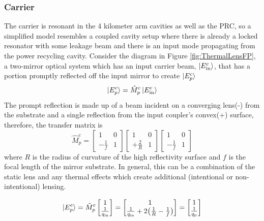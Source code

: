 		\subsubsection{Carrier}\label{Sec:carrier_lensing}
		The carrier is resonant in the 4 kilometer arm cavities as well as the PRC, so a simplified model resembles a coupled cavity setup where there is already a locked resonator with some leakage beam and there is an input mode propagating from the power recycling cavity.  Consider the diagram in Figure \ref{fig:ThermalLensFP}, a two-mirror optical system which has an input carrier beam, $\ket{E^c_{\text{in}}}$, that has a portion promptly reflected off the input mirror to create $\ket{E^c_{p}}$
		\begin{equation}
		\ket{E^{c}_{p}} = \hat{M}^{c}_{p} \ket{E^{c}_{\text{in}}}
		\end{equation}
		The prompt reflection is made up of a beam incident on a converging lens(-) from the substrate and a single reflection from the input coupler's convex(+) surface, therefore, the transfer matrix is
		\begin{equation}
		\hat{M}^{c}_{p} = 
		\begin{bmatrix}
						1 	&	0 
		\\ 	-\frac{1}{f} 	&	1
		\end{bmatrix}
		\begin{bmatrix}
						1 	&	0 
		\\ 	+\frac{2}{R} 	&	1
		\end{bmatrix}
		\begin{bmatrix}
						1 	&	0 
		\\ 	-\frac{1}{f} 	&	1
		\end{bmatrix}
		\end{equation}
		where $R$ is the radius of curvature of the high reflectivity surface and $f$ is the focal length of the mirror substrate. In general, this can be a combination of the static lens and any thermal effects which create additional (intentional or non-intentional) lensing.
		
		\begin{equation}\label{eq:promptE}
		 \ket{E^{c}_{p}}=
		 \hat{M}^{c}_{p}
		 \begin{bmatrix}
		 					1  
		 \\ 	\frac{1}{q_{\text{in}}}
		 \end{bmatrix}
		 =
		 \begin{bmatrix}
		 1  
		 \\ 	\frac{1}{q_{\text{in}}} + 2 \big(\frac{1}{R} - \frac{1}{f}\big)
		 \end{bmatrix}
		 =
		 \begin{bmatrix}
		 1  
		 \\ 	\frac{1}{q_{\text{p}}}
		 \end{bmatrix}
		\end{equation}
		

